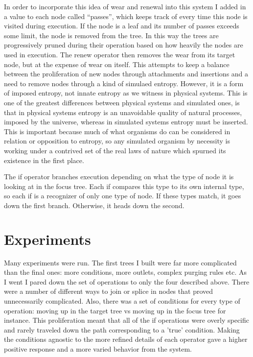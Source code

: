 \documentclass[12pt]{article}
\begin{document}
In order to incorporate this idea of wear and renewal into this system I added in a value to each node called ``passes'', which keeps track of every time this node is visited during execution.  If the node is  a leaf and its number of passes exceeds some limit, the node is removed from the tree.  In this way the trees are progressively pruned during their operation based on how heavily the nodes are used in execution.  The renew operator then removes the wear from its target node, but at the expense of wear on itself.  This attempts to keep a balance between the proliferation of new nodes through attachments and insertions and a need to remove nodes through a kind of simulaed entropy.  However, it is a form of imposed entropy, not innate entropy as we witness in physical systems.  This is one of the greatest differences between physical systems and simulated ones, is that in physical systems entropy is an unavoidable quality of natural processes, imposed by the universe, whereas in simulated systems entropy must be inserted.  This is important because much of what organisms do can be considered in relation or opposition to entropy, so any simulated organism by necessity is working under a contrived set of the real laws of nature which spurned its existence in the first place.  

The if operator branches execution depending on what the type of node it is looking at in the focus tree.  Each if compares this type to its own internal type, so each if is a recognizer of only one type of node.  If these types match, it goes down the first branch.  Otherwise, it heads down the second.

\section{Experiments}

Many experiments were run.  The first trees I built were far more complicated than the final ones:  more conditions, more outlets, complex purging rules etc.  As I went I pared down the set of operations to only the four described above.  There were a number of different ways to join or splice in nodes that proved unnecessarily complicated.  Also, there was a set of conditions for every type of operation:  moving up in the target tree vs moving up in the focus tree for instance.  This proliferation meant that all of the if operations were overly specific and rarely traveled down the path corresponding to a 'true' condition.  Making the conditions agnostic to the more refined details of each operator gave a higher positive response and a more varied behavior from the system.  
\end{document}
